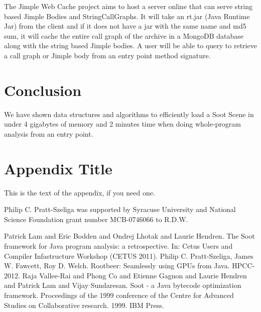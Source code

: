 \documentclass[preprint]{sigplanconf}
\begin{document}
The Jimple Web Cache project aims to host a server online that can serve string based Jimple Bodies and StringCallGraphs. It will take an rt.jar (Java Runtime Jar) from the client and if it does not have a jar with the same name and md5 sum, it will cache the entire call graph of the archive in a MongoDB database along with the string based Jimple bodies. A user will be able to query to retrieve a call graph or Jimple body from an entry point method signature.

\section{Conclusion}
\label{sec:conclusion}
We have shown data structures and algorithms to efficiently load a Soot Scene in under 4 gigabytes of memory and 2 minutes time when doing whole-program analysis from an entry point.

\appendix
\section{Appendix Title}

This is the text of the appendix, if you need one.

\acks
Philip C. Pratt-Szeliga was supported by Syracuse University and National Science Foundation grant number MCB-0746066 to R.D.W.





\begin{thebibliography}{}
\softraggedright

 Patrick Lam and Eric Bodden and Ondrej Lhotak and Laurie Hendren. The Soot framework for Java program analysis: a retrospective. In: Cetus Users and Compiler Infastructure Workshop (CETUS 2011).
 Philip C. Pratt-Szeliga, James W. Fawcett, Roy D. Welch. Rootbeer: Seamlessly using GPUs from Java. HPCC-2012.
 Raja Vallee-Rai and Phong Co and Etienne Gagnon and Laurie Hendren and Patrick Lam and Vijay Sundaresan. Soot - a Java bytecode optimization framework. Proceedings of the 1999 conference of the Centre for Advanced Studies on Collaborative research. 1999. IBM Press.

\end{thebibliography}
\end{document}
